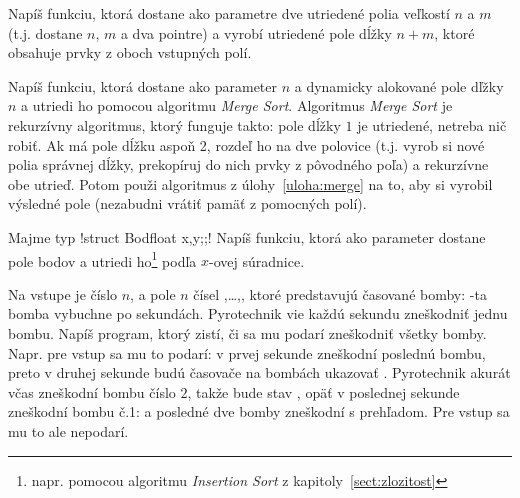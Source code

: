 \begin{uloha}
  \label{uloha:merge}
  Napíš funkciu, ktorá dostane ako parametre dve utriedené polia veľkostí $n$ a $m$
  (t.j. dostane $n$, $m$ a dva pointre) a vyrobí utriedené pole dĺžky $n+m$, 
  ktoré obsahuje prvky z oboch vstupných polí.
\end{uloha}

\begin{uloha}
  \label{uloha:mergesort}
  Napíš funkciu, ktorá dostane ako parameter $n$ a dynamicky alokované pole
  dľžky $n$ a utriedi ho pomocou algoritmu {\em Merge Sort}. Algoritmus {\em Merge
  Sort} je rekurzívny algoritmus, ktorý funguje takto: pole dĺžky $1$ je utriedené,
  netreba nič robiť. Ak má pole dĺžku aspoň 2, rozdeľ ho na dve polovice (t.j.
  vyrob si nové polia správnej dĺžky, prekopíruj do nich prvky z pôvodného poľa)
  a rekurzívne obe utrieď. Potom použi algoritmus z úlohy~\ref{uloha:merge} na to,
  aby si vyrobil výsledné pole (nezabudni vrátiť pamäť z pomocných polí).
\end{uloha}

\begin{uloha}
  \label{uloha:sortbody}
  Majme typ \prg!struct Bod{float x,y;};! Napíš funkciu, ktorá ako parameter
  dostane pole bodov a utriedi ho\footnote{napr. pomocou algoritmu {\em Insertion Sort}
  z kapitoly~\ref{sect:zlozitost}} podľa $x$-ovej súradnice.
\end{uloha}

\begin{uloha}
  Na vstupe je číslo $n$, a pole $n$ čísel ,\ldots,, ktoré 
  predstavujú časované bomby: -ta bomba vybuchne po  sekundách.
  Pyrotechnik vie každú sekundu zneškodniť jednu bombu. Napíš program, ktorý
  zistí, či sa mu podarí zneškodniť všetky bomby. Napr. pre vstup  
  sa mu to podarí: v prvej sekunde zneškodní poslednú bombu, preto v druhej sekunde
  budú časovače na bombách ukazovať . Pyrotechnik akurát včas zneškodní
  bombu číslo $2$, takže bude stav , opäť v poslednej
  sekunde zneškodní bombu č.1:  a posledné dve bomby
  zneškodní s prehľadom. Pre vstup  sa mu to ale nepodarí.
\end{uloha}
